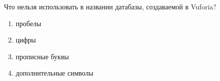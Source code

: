 
Что нельзя использовать в названии датабазы, создаваемой в Vuforia?

\begin{enumerate}
    \item пробелы
    \item цифры
    \item прописные буквы
    \item дополнительные символы
\end{enumerate}

